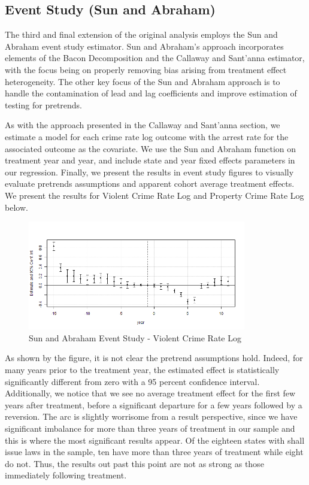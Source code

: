 \documentclass{article}
\begin{document}
\subsection{Event Study (Sun and Abraham)}

The third and final extension of the original analysis employs the Sun and Abraham event study estimator. Sun and Abraham's approach incorporates elements of the Bacon Decomposition and the Callaway and Sant'anna estimator, with the focus being on properly removing bias arising from treatment effect heterogeneity. The other key focus of the Sun and Abraham approach is to handle the contamination of lead and lag coefficients and improve estimation of testing for pretrends.

As with the approach presented in the Callaway and Sant'anna section, we estimate a model for each crime rate log outcome with the arrest rate for the associated outcome as the covariate. We use the Sun and Abraham function on treatment year and year, and include state and year fixed effects parameters in our regression. Finally, we present the results in event study figures to visually evaluate pretrends assumptions and apparent cohort average treatment effects. We present the results for Violent Crime Rate Log and Property Crime Rate Log below.

\begin{figure}[H]
	\begin{center}
		\includegraphics[width=0.85\textwidth]{violent}
	\end{center}
	\caption{Sun and Abraham Event Study - Violent Crime Rate Log}
	\label{fig:violent_graph}
\end{figure}

As shown by the figure, it is not clear the pretrend assumptions hold. Indeed, for many years prior to the treatment year, the estimated effect is statistically significantly different from zero with a 95 percent confidence interval. Additionally, we notice that we see no average treatment effect for the first few years after treatment, before a significant departure for a few years followed by a reversion. The arc is slightly worrisome from a result perspective, since we have significant imbalance for more than three years of treatment in our sample and this is where the most significant results appear. Of the eighteen states with shall issue laws in the sample, ten have more than three years of treatment while eight do not. Thus, the results out past this point are not as strong as those immediately following treatment.
\end{document}
